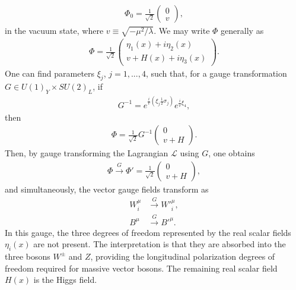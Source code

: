 \documentclass[twoside,english]{uiofysmaster}
\begin{document}
\begin{align}
	\Phi_0 = \frac{1}{\sqrt{2}} \begin{pmatrix}
		0 \\ v
	\end{pmatrix},
\end{align}
in the vacuum state, where $v \equiv \sqrt{-\mu^2/\lambda}$. We may write $\Phi$ generally as
\begin{align}
	\Phi = \frac{1}{\sqrt{2}} \begin{pmatrix}
		\eta_1(x) + i\eta_2(x) \\
		v + H(x) + i\eta_3(x)
	\end{pmatrix}.
\end{align}
One can find parameters $\xi_j$, $j=1,...,4$, such that, for a gauge transformation $G \in U(1)_Y\times SU(2)_L$, if
\begin{align}
	G^{-1} = e^{\frac{i}{v}\left(\xi_j\frac{1}{2}\sigma_j\right)} e^{\frac{i}{v} \xi_4},
\end{align}
then
\begin{align}
	\Phi = \frac{1}{\sqrt{2}} G^{-1} \begin{pmatrix}
		0 \\ v + H
	\end{pmatrix}.
\end{align}
Then, by gauge transforming the Lagrangian $\mathcal{L}$ using $G$, one obtains
\begin{align}
	\Phi \overset{G}{\to} \Phi' = \frac{1}{\sqrt{2}}\begin{pmatrix}
		0 \\ v + H
	\end{pmatrix},
\end{align}
and simultaneously, the vector gauge fields transform as
\begin{align}
	W^\mu_i &\overset{G}{\to} W'^\mu_i ,\label{eq:SSB_gauge_transformation}\\
	B^\mu &\overset{G}{\to} B'^\mu .\nonumber
\end{align}
In this gauge, the three degrees of freedom represented by the real scalar fields $\eta_i(x)$ are not present. The interpretation is that they are absorbed into the three bosons $W^\pm$ and $Z$, providing the longitudinal polarization degrees of freedom required for massive vector bosons. The remaining real scalar field $H(x)$ is the Higgs field.
\end{document}
